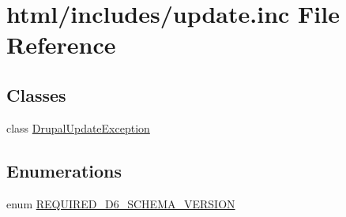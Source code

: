 \hypertarget{update_8inc}{
\section{html/includes/update.inc File Reference}
\label{update_8inc}
}
\subsection*{Classes}
\begin{DoxyCompactItemize}
\item 
class \hyperlink{classDrupalUpdateException}{DrupalUpdateException}
\end{DoxyCompactItemize}
\subsection*{Enumerations}
\begin{DoxyCompactItemize}
\item 
enum \hyperlink{update_8inc_acba191c88d6f0e38bec3a5f873f57108}{REQUIRED\_\-D6\_\-SCHEMA\_\-VERSION} 
\end{DoxyCompactItemize}
